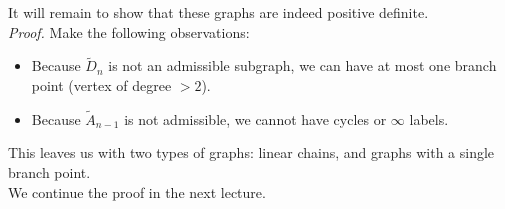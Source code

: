 It will remain to show that these
graphs are indeed positive definite.
\\

{\em Proof.}
Make the following observations:

\begin{itemize}
\item
Because $\widetilde{D}_n$ is not an admissible subgraph, we can have at most
one branch point (vertex of degree $>2$).
\item
Because $\widetilde{A}_{n-1}$ is not admissible, we cannot have cycles or
$\infty$ labels.
\end{itemize}

This leaves us with two types of graphs: linear chains, and graphs with
a single branch point.
\\

We continue the proof in the next lecture.
